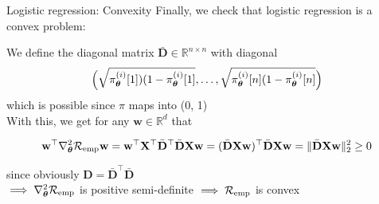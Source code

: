 \documentclass[11pt,compress,t,notes=noshow, xcolor=table]{beamer}
\begin{document}
\begin{frame}{Logistic regression: Convexity}
Finally, we check that logistic regression is a convex problem:
\vfill

We define the diagonal matrix $\bar{\mathbf{D}} \in \mathbb{R}^{n \times n}$ with diagonal 
$$\Big(\sqrt{ \pi^{(i)}_{\bm{\theta}}[1])(1- \pi^{(i)}_{\bm{\theta}}[1]}, \dots, \sqrt{ \pi^{(i)}_{\bm{\theta}}[n](1- \pi^{(i)}_{\bm{\theta}}[n]}\Big) $$
which is possible since $\pi$ maps into (0, 1) \\
\vfill
With this, we get for any $\mathbf{w} \in \mathbb{R}^d$ that

$$\mathbf{w}^\top  \nabla^2_{\bm{\theta}}\mathcal{R}_{\text{emp}} \mathbf{w} =   \mathbf{w}^\top  \mathbf{X}^\top \bar{\mathbf{D}}^\top \bar{\mathbf{D}}\mathbf{X} \mathbf{w} = (\bar{\mathbf{D}}\mathbf{X} \mathbf{w})^\top\bar{\mathbf{D}}\mathbf{X} \mathbf{w} = \Vert \bar{\mathbf{D}}\mathbf{X} \mathbf{w} \Vert^2_2 \geq 0$$

since obviously $\mathbf{D} = \bar{\mathbf{D}}^\top \bar{\mathbf{D}}$ \\
\vfill
$\implies \nabla^2_{\bm{\theta}}\mathcal{R}_{\text{emp}}$ is positive semi-definite $\implies \mathcal{R}_{\text{emp}}$ is convex

\end{frame}

\endlecture
\end{document}
